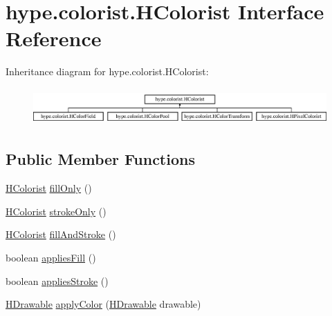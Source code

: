 \hypertarget{interfacehype_1_1colorist_1_1_h_colorist}{\section{hype.\-colorist.\-H\-Colorist Interface Reference}
\label{interfacehype_1_1colorist_1_1_h_colorist}
}
Inheritance diagram for hype.\-colorist.\-H\-Colorist\-:\begin{figure}[H]
\begin{center}
\leavevmode
\includegraphics[height=1.443299cm]{interfacehype_1_1colorist_1_1_h_colorist}
\end{center}
\end{figure}
\subsection*{Public Member Functions}
\begin{DoxyCompactItemize}
\item 
\hyperlink{interfacehype_1_1colorist_1_1_h_colorist}{H\-Colorist} \hyperlink{interfacehype_1_1colorist_1_1_h_colorist_a5f9f9cae6981d0a4775a153402bea719}{fill\-Only} ()
\item 
\hyperlink{interfacehype_1_1colorist_1_1_h_colorist}{H\-Colorist} \hyperlink{interfacehype_1_1colorist_1_1_h_colorist_ac55134266720e757465c9b60ca8f10eb}{stroke\-Only} ()
\item 
\hyperlink{interfacehype_1_1colorist_1_1_h_colorist}{H\-Colorist} \hyperlink{interfacehype_1_1colorist_1_1_h_colorist_ac17f131eb3153c400eb6efa1a8d3db61}{fill\-And\-Stroke} ()
\item 
boolean \hyperlink{interfacehype_1_1colorist_1_1_h_colorist_acf79ff4b96368ee59574c5e733ac7227}{applies\-Fill} ()
\item 
boolean \hyperlink{interfacehype_1_1colorist_1_1_h_colorist_ac1737f3e14cd909ff185c11feeae6a5c}{applies\-Stroke} ()
\item 
\hyperlink{classhype_1_1drawable_1_1_h_drawable}{H\-Drawable} \hyperlink{interfacehype_1_1colorist_1_1_h_colorist_a2abb7d4de895ac051b6f2126fd83a5fc}{apply\-Color} (\hyperlink{classhype_1_1drawable_1_1_h_drawable}{H\-Drawable} drawable)
\end{DoxyCompactItemize}


